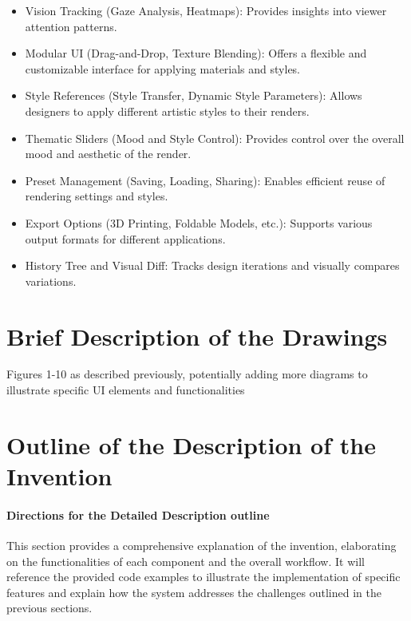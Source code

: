 \documentclass{article}
\begin{document}
\begin{itemize}
    \item Vision Tracking (Gaze Analysis, Heatmaps): Provides insights into viewer attention patterns.

    \item Modular UI (Drag-and-Drop, Texture Blending): Offers a flexible and customizable interface for applying materials and styles.

    \item  Style References (Style Transfer, Dynamic Style Parameters): Allows designers to apply different artistic styles to their renders.

    \item Thematic Sliders (Mood and Style Control): Provides control over the overall mood and aesthetic of the render.

    \item Preset Management (Saving, Loading, Sharing): Enables efficient reuse of rendering settings and styles.

    \item Export Options (3D Printing, Foldable Models, etc.): Supports various output formats for different applications.

    \item History Tree and Visual Diff: Tracks design iterations and visually compares variations.

\end{itemize}

\section{Brief Description of the Drawings}

Figures 1-10 as described previously, potentially adding more diagrams to illustrate specific UI elements and functionalities


\section{Outline of the Description of the Invention}

\paragraph{Directions for the Detailed Description outline}

This section provides a comprehensive explanation of the invention, elaborating on the functionalities of each component and the overall workflow.  It will reference the provided code examples to illustrate the implementation of specific features and explain how the system addresses the challenges outlined in the previous sections.
\end{document}
